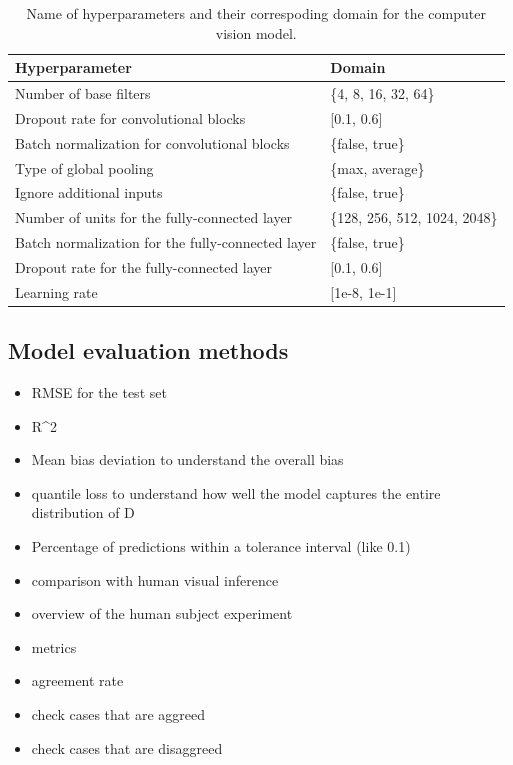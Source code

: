 \documentclass[]{interact}
\theoremstyle{plain}%
\theoremstyle{definition}
\theoremstyle{remark}
\begin{document}
\begin{table}

\caption{\label{tab:hyperparameter}Name of hyperparameters and their correspoding domain for the computer vision model.}
\centering
\begin{tabular}[t]{ll}
\toprule
Hyperparameter & Domain\\
\midrule
Number of base filters & \{4, 8, 16, 32, 64\}\\
Dropout rate for convolutional blocks & {}[0.1, 0.6]\\
Batch normalization for convolutional blocks & \{false, true\}\\
Type of global pooling & \{max, average\}\\
Ignore additional inputs & \{false, true\}\\
\addlinespace
Number of units for the fully-connected layer & \{128, 256, 512, 1024, 2048\}\\
Batch normalization for the fully-connected layer & \{false, true\}\\
Dropout rate for the fully-connected layer & {}[0.1, 0.6]\\
Learning rate & {}[1e-8, 1e-1]\\
\bottomrule
\end{tabular}
\end{table}

\hypertarget{model-evaluation-methods}{%
\subsection{Model evaluation methods}\label{model-evaluation-methods}}

\begin{itemize}
\item
  RMSE for the test set
\item
  R\^{}2
\item
  Mean bias deviation to understand the overall bias
\item
  quantile loss to understand how well the model captures the entire
  distribution of D
\item
  Percentage of predictions within a tolerance interval (like 0.1)
\item
  comparison with human visual inference
\item
  overview of the human subject experiment
\item
  metrics
\item
  agreement rate
\item
  check cases that are aggreed
\item
  check cases that are disaggreed
\end{itemize}
\end{document}
